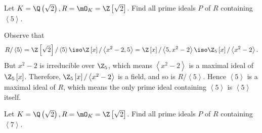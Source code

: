 \documentclass[pmath441]{subfiles}
\begin{document}
    \begin{example}{}
        Let $K=\Q\left( \sqrt{2} \right), R = \mO_K = \Z\left[ \sqrt{2} \right]$. Find all prime ideals $P$ of $R$ containing $\left< 5 \right>$. 
    \end{example}

    \begin{answer}
        Observe that
        \begin{equation*}
            R /\left< 5 \right> = \Z\left[ \sqrt{2} \right] /\left< 5 \right> \iso \Z\left[ x \right] / \left< x^{2}-2,5 \right>  = \Z\left[ x \right] / \left< 5,x^{2}-2 \right> \iso \Z_5\left[ x \right] / \left< x^{2}-2 \right> .
        \end{equation*}
        But $x^{2}-2$ is irreducible over $\Z_5$, which means $\left< x^{2}-2 \right>$ is a maximal ideal of $\Z_5\left[ x \right]$. Therefore, $\Z_5\left[ x \right] /\left< x^{2}-2 \right>$ is a field, and so is $R /\left< 5 \right>$. Hence $\left< 5 \right>$ is a maximal ideal of $R$, which means the only prime ideal containing $\left< 5 \right>$ is $\left< 5 \right>$ itself.  
    \end{answer}

    \begin{example}{}
        Let $K=\Q\left( \sqrt{2} \right), R = \mO_K = \Z\left[ \sqrt{2} \right]$. Find all prime ideals $P$ of $R$ containing $\left< 7 \right>$. 
    \end{example}
\end{document}
